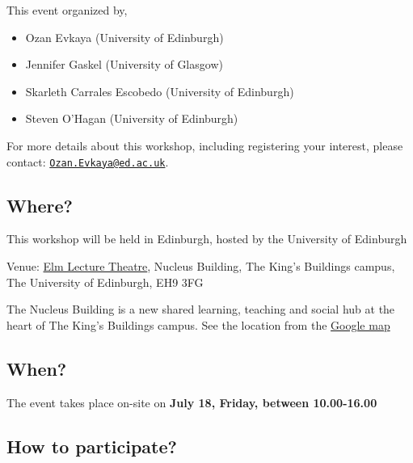 \documentclass[
  letterpaper,
  DIV=11,
  numbers=noendperiod]{scrartcl}
\providecommand{\tightlist}{%
  \setlength{\itemsep}{0pt}\setlength{\parskip}{0pt}}\usepackage{longtable,booktabs,array}
\begin{document}
This event organized by,

\begin{itemize}
\tightlist
\item
  Ozan Evkaya (University of Edinburgh)
\item
  Jennifer Gaskel (University of Glasgow)
\item
  Skarleth Carrales Escobedo (University of Edinburgh)
\item
  Steven O'Hagan (University of Edinburgh)
\end{itemize}

For more details about this workshop, including registering your
interest, please contact:
\href{mailto:Ozan.Evkaya@ed.ac.uk}{\nolinkurl{Ozan.Evkaya@ed.ac.uk}}.

\hypertarget{where}{%
\subsection{Where?}\label{where}}

This workshop will be held in Edinburgh, hosted by the University of
Edinburgh

Venue:
\href{https://information-services.ed.ac.uk/computing/audio-visual-multi-media/teaching-spaces/interactive-360-degree-images-of-teaching-spaces/nucleus/nucleus-g02-elmlt}{Elm
Lecture Theatre}, Nucleus Building, The King's Buildings campus, The
University of Edinburgh, EH9 3FG

The Nucleus Building is a new shared learning, teaching and social hub
at the heart of The King's Buildings campus. See the location from the
\href{https://www.google.com/maps/place/The+Nucleus+Building,+The+University+of+Edinburgh/@55.9228707,-3.1739974,15z/data=!4m6!3m5!1s0x4887c74db76c8ddd:0x30d53c72c9accbd8!8m2!3d55.9229639!4d-3.1739935!16s\%2Fg\%2F11sb86zt46?entry=ttu\&g_ep=EgoyMDI1MDMzMS4wIKXMDSoJLDEwMjExNjQwSAFQAw\%3D\%3D}{Google
map}

\hypertarget{when}{%
\subsection{When?}\label{when}}

The event takes place on-site on \textbf{July 18, Friday, between
10.00-16.00}

\hypertarget{how-to-participate}{%
\subsection{How to participate?}\label{how-to-participate}}
\end{document}
